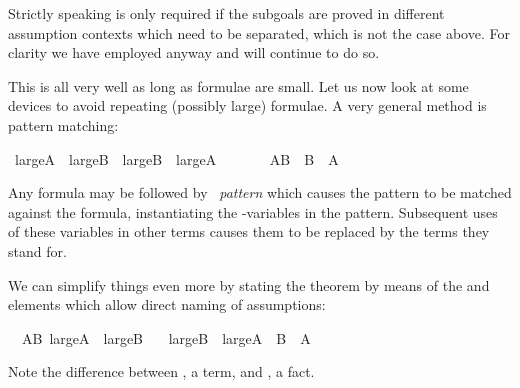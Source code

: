 \begin{isabellebody}
\begin{isamarkuptext}
\begin{description}
Strictly speaking  is only required if the subgoals
are proved in different assumption contexts which need to be
separated, which is not the case above. For clarity we
have employed  anyway and will continue to do so.
\end{description}

This is all very well as long as formulae are small. Let us now look at some
devices to avoid repeating (possibly large) formulae. A very general method
is pattern matching:%
\end{isamarkuptext}%
\isamarkuptrue%
\ {\isachardoublequote}large{\isacharunderscore}A\ {\isasymand}\ large{\isacharunderscore}B\ {\isasymLongrightarrow}\ large{\isacharunderscore}B\ {\isasymand}\ large{\isacharunderscore}A{\isachardoublequote}\isanewline
\ \ \ \ \ \ {\isacharparenleft}\ {\isachardoublequote}{\isacharquery}AB\ {\isasymLongrightarrow}\ {\isacharquery}B\ {\isasymand}\ {\isacharquery}A{\isachardoublequote}{\isacharparenright}\isanewline
\isamarkupfalse%
\isamarkupfalse%
\isamarkupfalse%
\isamarkupfalse%
\isamarkupfalse%
\isamarkupfalse%
\isamarkupfalse%
\isamarkupfalse%
\isamarkupfalse%
\isamarkupfalse%
%
\begin{isamarkuptext}%
\noindent Any formula may be followed by
\isa{{\isacharparenleft}}~\emph{pattern}\isa{{\isacharparenright}} which causes the pattern
to be matched against the formula, instantiating the \isa{{\isacharquery}}-variables in
the pattern. Subsequent uses of these variables in other terms causes
them to be replaced by the terms they stand for.

We can simplify things even more by stating the theorem by means of the
 and  elements which allow direct
naming of assumptions:%
\end{isamarkuptext}%
\isamarkuptrue%
\ \ AB{\isacharcolon}\ {\isachardoublequote}large{\isacharunderscore}A\ {\isasymand}\ large{\isacharunderscore}B{\isachardoublequote}\isanewline
\ \ \ {\isachardoublequote}large{\isacharunderscore}B\ {\isasymand}\ large{\isacharunderscore}A{\isachardoublequote}\ {\isacharparenleft}\ {\isachardoublequote}{\isacharquery}B\ {\isasymand}\ {\isacharquery}A{\isachardoublequote}{\isacharparenright}\isanewline
\isamarkupfalse%
\isamarkupfalse%
\isamarkupfalse%
\isamarkupfalse%
\isamarkupfalse%
\isamarkupfalse%
\isamarkupfalse%
\isamarkupfalse%
\isamarkupfalse%
\isamarkupfalse%
%
\begin{isamarkuptext}%
\noindent Note the difference between , a term, and
, a fact.


\end{isamarkuptext}
\end{isabellebody}
